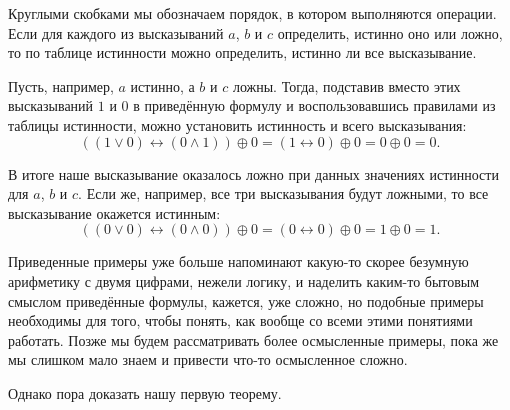 Круглыми скобками мы обозначаем порядок, в котором выполняются операции. Если для каждого из высказываний $a$, $b$ и $c$ определить, истинно оно или ложно, то по таблице истинности можно определить, истинно ли все высказывание.

Пусть, например, $a$ истинно, а $b$ и $c$ ложны. Тогда, подставив вместо этих высказываний $1$ и $0$ в приведённую формулу и воспользовавшись правилами из таблицы истинности, можно установить истинность и всего высказывания:
$$
((1 \lor 0) \leftrightarrow (0 \land 1)) \oplus 0 = (1 \leftrightarrow 0) \oplus 0 = 0 \oplus 0 = 0.
$$

В итоге наше высказывание оказалось ложно при данных значениях истинности для $a$, $b$ и $c$. Если же, например, все три высказывания будут ложными, то все высказывание окажется истинным:
$$
((0 \lor 0) \leftrightarrow (0 \land 0)) \oplus 0 = (0 \leftrightarrow 0) \oplus 0 = 1 \oplus 0 = 1.
$$

Приведенные примеры уже больше напоминают какую-то скорее безумную арифметику с двумя цифрами, нежели логику, и наделить каким-то бытовым смыслом приведённые формулы, кажется, уже сложно, но подобные примеры необходимы для того, чтобы понять, как вообще со всеми этими понятиями работать. Позже мы будем рассматривать более осмысленные примеры, пока же мы слишком мало знаем и привести что-то осмысленное сложно.

Однако пора доказать нашу первую теорему.

